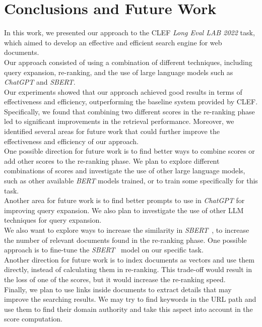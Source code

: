 
\section{Conclusions and Future Work}
\label{sec:conclusion}
 
In this work, we presented our approach to the \ac{CLEF} \textit{Long Eval LAB 2022} task, which aimed to develop an effective and efficient search engine for web documents. \\
Our approach consisted of using a combination of different techniques, including query expansion, re-ranking, and the use of large language models such as \textit{ChatGPT} and \textit{SBERT}. \\
Our experiments showed that our approach achieved good results in terms of effectiveness and efficiency, outperforming the baseline system provided by \ac{CLEF}. Specifically, we found that combining two different scores in the re-ranking phase led to significant improvements in the retrieval performance. Moreover, we identified several areas for future work that could further improve the effectiveness and efficiency of our approach. \\
One possible direction for future work is to find better ways to combine scores or add other scores to the re-ranking phase. We plan to explore different combinations of scores and investigate the use of other large language models, such as other available \textit{BERT} models trained, or to train some specifically for this task. \\
Another area for future work is to find better prompts \cite{wang2023chatgpt} to use in \textit{ChatGPT} for improving query expansion. We also plan to investigate the use of other \ac{LLM} techniques for query expansion. \\
We also want to explore ways to increase the similarity in \textit{SBERT}~\cite{reimers-2019-sentence-bert}, to increase the number of relevant documents found in the re-ranking phase. One possible approach is to fine-tune the \textit{SBERT}~\cite{reimers-2019-sentence-bert} model on our specific task. \\
Another direction for future work is to index documents as vectors and use them directly, instead of calculating them in re-ranking. This trade-off would result in the loss of one of the scores, but it would increase the re-ranking speed. \\
Finally, we plan to use links inside documents to extract details that may improve the searching results. We may try to find keywords in the URL path and use them to find their domain authority and take this aspect into account in the score computation.

